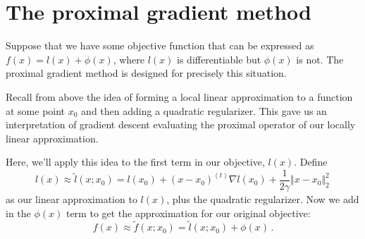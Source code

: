 \documentclass{article}
\newcommand{\enorm}[1]{\Vert #1 \Vert_2}
\begin{document}


\section{The proximal gradient method}

Suppose that we have some objective function that can be expressed as $f(x) = l(x) + \phi(x)$, where $l(x)$ is differentiable but $\phi(x)$ is not.  The proximal gradient method is designed for precisely this situation.

Recall from above the idea of forming a local linear approximation to a function at some point $x_0$ and then adding a quadratic regularizer.  This gave us an interpretation of gradient descent evaluating the proximal operator of our locally linear approximation.

Here, we'll apply this idea to the first term in our objective, $l(x)$. Define
$$
l(x) \approx \tilde{l}(x; x_0) = l(x_0) + (x - x_0)^{(t)} \nabla l(x_0) + \frac{1}{2\gamma} \enorm{x - x_0}^2 \, 
$$
as our linear approximation to $l(x)$, plus the quadratic regularizer.  Now we add in the $\phi(x)$ term to get the approximation for our original objective:
\begin{equation}
\label{eqn:pg_approx}
f(x) \approx \tilde{f}(x; x_0) = \tilde{l}(x; x_0) + \phi(x)   \, .
\end{equation}
\end{document}
